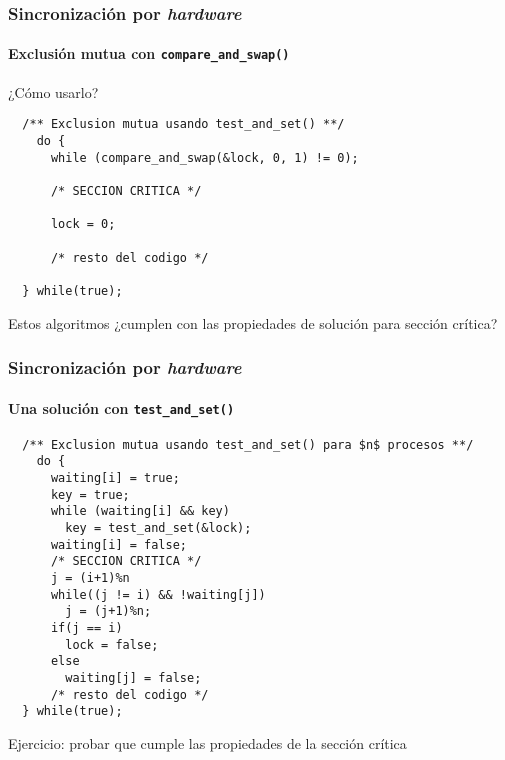 \documentclass[letter]{beamer}
\begin{document}
\begin{frame}[fragile]
  \frametitle{Sincronización por {\em hardware} }
  \framesubtitle{Exclusión mutua con {\tt compare\_and\_swap()}}

  ¿Cómo usarlo?

\begin{verbatim}
  /** Exclusion mutua usando test_and_set() **/
    do {
      while (compare_and_swap(&lock, 0, 1) != 0);
      
      /* SECCION CRITICA */
      
      lock = 0;
  
      /* resto del codigo */
      
  } while(true);
\end{verbatim}

Estos algoritmos ¿cumplen con las propiedades de solución para sección crítica?

\end{frame}


\begin{frame}[fragile]
  \frametitle{Sincronización por {\em hardware} }
  \framesubtitle{Una solución con {\tt test\_and\_set()}}

\begin{verbatim}
  /** Exclusion mutua usando test_and_set() para $n$ procesos **/
    do {
      waiting[i] = true;
      key = true;
      while (waiting[i] && key) 
        key = test_and_set(&lock);
      waiting[i] = false;
      /* SECCION CRITICA */
      j = (i+1)%n
      while((j != i) && !waiting[j])
        j = (j+1)%n;
      if(j == i) 
        lock = false;
      else
        waiting[j] = false;
      /* resto del codigo */
  } while(true);
\end{verbatim}

Ejercicio: probar que cumple las propiedades de la sección crítica
\end{frame}
\end{document}
